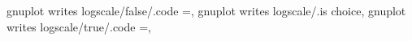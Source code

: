 gnuplot writes logscale/false/.code                                ={\gdef\pgfplots@gnuplot@logscale@writes@log{0}},                                                                                  
gnuplot writes logscale/.is choice,
gnuplot writes logscale/true/.code                                 ={\gdef\pgfplots@gnuplot@logscale@writes@log{1}},                                                                                  

